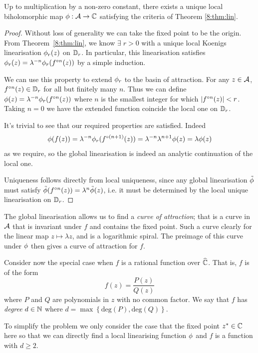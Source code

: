 \documentclass[../main.tex]{subfiles}
\begin{document}
\begin{thm} 
    \label{8:thm:attlinglob}
    Up to multiplication by a non-zero constant, there exists a unique local biholomorphic map $\phi:\mathcal{A}\to\mathbb{C}$ satisfying the criteria of Theorem \eqref{8:thm:lin}.
\end{thm}
\begin{proof}
    Without loss of generality we can take the fixed point to be the origin. From Theorem~\ref{8:thm:lin}, we know $\exists\; r>0$ with a unique local Koenigs linearisation $\phi_r(z)$ on $\mathbb{D}_r$. In particular, this linearisation satisfies $\phi_r(z)=\lambda^{-n}\phi_r(f^{\circ n}(z))$ by a simple induction. 
    
    We can use this property to extend $\phi_r$ to the basin of attraction. For any $z\in\mathcal{A}$, $f^{\circ n}(z) \in \mathbb{D}_r$ for all but finitely many $n$. Thus we can define $\phi(z)=\lambda^{-n}\phi_r(f^{\circ n}(z))$ where $n$ is the smallest integer for which $\left|f^{\circ n}(z)\right|<r$. Taking $n=0$ we have the extended function coincide the local one on $\mathbb{D}_r$.
    
    It's trivial to see that our required properties are satisfied. Indeed 
    \[
    \phi(f(z))=\lambda^{-n} \phi_{r}(f^{\circ(n+1)}(z))=\lambda^{-n} \lambda^{n+1}\phi(z) =\lambda \phi(z)
    \]
    as we require, so the global linearisation is indeed an analytic continuation of the local one. 
    
    Uniqueness follows directly from local uniqueness, since any global linearisation $\tilde{\phi}$ must satisfy $\tilde{\phi}(f^{\circ n}(z))=\lambda^n \tilde{\phi}(z)$, i.e. it must be determined by the local unique linearisation on $\mathbb{D}_r$.
\end{proof}

The global linearisation allows us to find a \emph{curve of attraction}; that is a curve in $\mathcal{A}$ that is invariant under $f$ and contains the fixed point. Such a curve clearly for the linear map $z\mapsto \lambda z$, and is a logarithmic spiral. The preimage of this curve under $\phi$ then gives a curve of attraction for $f$.

Consider now the special case when $f$ is a rational function over $\widehat{\mathbb{C}}$. That is, $f$ is of the form
\[
f(z) = \frac{P(z)}{Q(z)}
\]
where $P$ and $Q$ are polynomials in $z$ with no common factor. We say that $f$ has \emph{degree} $d \in \mathbb{N}$ where $d = \max\left\{\text{deg}(P), \text{deg}(Q)\right\}$.

To simplify the problem we only consider the case that the fixed point $z^* \in \mathbb{C}$ here so that we can directly find a local linearising function $\phi$ and $f$ is a function with $d \geq 2$.
\end{document}

